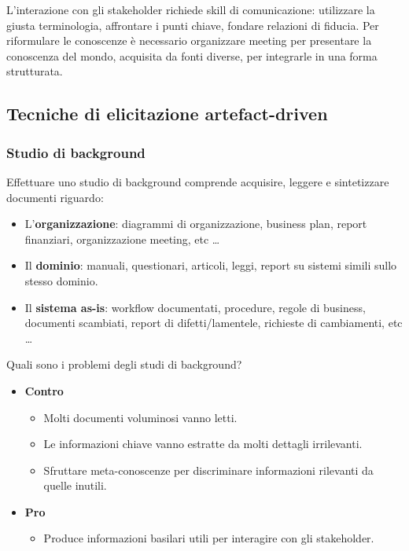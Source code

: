 \documentclass[../main.tex]{subfiles}
\begin{document}
L'interazione con gli stakeholder richiede skill di comunicazione: utilizzare la giusta terminologia, affrontare i punti chiave, fondare relazioni di fiducia.
Per riformulare le conoscenze è necessario organizzare meeting per presentare la conoscenza del mondo, acquisita da fonti diverse, per integrarle in una forma strutturata.
\subsection{Tecniche di elicitazione artefact-driven}
\subsubsection{Studio di background}
Effettuare uno studio di background comprende acquisire, leggere e sintetizzare documenti riguardo:
\begin{itemize}
	\item L'\textbf{organizzazione}: diagrammi di organizzazione, business plan, report finanziari, organizzazione meeting, etc \dots
	\item Il \textbf{dominio}: manuali, questionari, articoli, leggi, report su sistemi simili sullo stesso dominio.
	\item Il \textbf{sistema as-is}: workflow documentati, procedure, regole di business, documenti scambiati, report di difetti/lamentele, richieste di cambiamenti, etc \dots
\end{itemize}
Quali sono i problemi degli studi di background?
\begin{itemize}
	\item \textbf{Contro}
	\begin{itemize}
		\item Molti documenti voluminosi vanno letti.
		\item Le informazioni chiave vanno estratte da molti dettagli irrilevanti.
		\item Sfruttare meta-conoscenze per discriminare informazioni rilevanti da quelle inutili.
	\end{itemize}
	\item \textbf{Pro}
	\begin{itemize}
		\item Produce informazioni basilari utili per interagire con gli stakeholder.
	\end{itemize}
\end{itemize}
\end{document}
